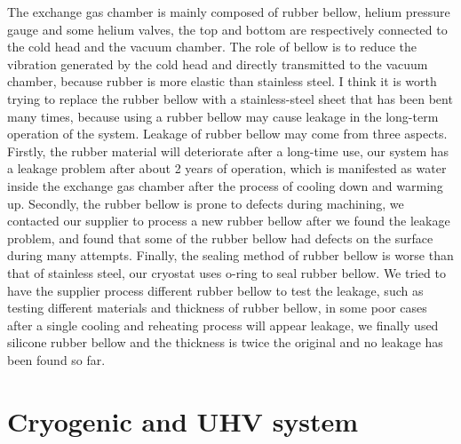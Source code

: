 The exchange gas chamber is mainly composed of rubber bellow, helium pressure gauge and some helium valves, the top and bottom are respectively connected to the cold head and the vacuum chamber. The role of bellow is to reduce the vibration generated by the cold head and directly transmitted to the vacuum chamber, because rubber is more elastic than stainless steel. I think it is worth trying to replace the rubber bellow with a stainless-steel sheet that has been bent many times, because using a rubber bellow may cause leakage in the long-term operation of the system. Leakage of rubber bellow may come from three aspects. Firstly, the rubber material will deteriorate after a long-time use, our system has a leakage problem after about 2 years of operation, which is manifested as water inside the exchange gas chamber after the process of cooling down and warming up. Secondly, the rubber bellow is prone to defects during machining, we contacted our supplier to process a new rubber bellow after we found the leakage problem, and found that some of the rubber bellow had defects on the surface during many attempts. Finally, the sealing method of rubber bellow is worse than that of stainless steel, our cryostat uses o-ring to seal rubber bellow. We tried to have the supplier process different rubber bellow to test the leakage, such as testing different materials and thickness of rubber bellow, in some poor cases after a single cooling and reheating process will appear leakage, we finally used silicone rubber bellow and the thickness is twice the original and no leakage has been found so far.



\section{Cryogenic and UHV system}

